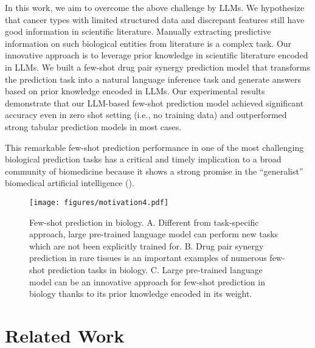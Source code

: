 In this work, we aim to overcome the above challenge by LLMs. We hypothesize that cancer types with limited structured data and discrepant features still have good information in scientific literature.  Manually extracting predictive information on such biological entities from literature is a complex task. Our innovative approach is to leverage prior knowledge in scientific literature encoded in LLMs. We built a few-shot drug pair synergy prediction model that transforms the prediction task into a natural language inference task and generate answers based on prior knowledge encoded in LLMs. Our experimental results demonstrate that our LLM-based few-shot prediction model achieved significant accuracy even in zero shot setting (i.e., no training data) and outperformed strong tabular prediction models in most cases. 

This remarkable few-shot prediction performance in one of the most challenging biological prediction tasks has a critical and timely implication to a broad community of biomedicine because it shows a strong promise in the ``generalist'' biomedical artificial intelligence (\cite{Moor2023-dp}). 

\begin{figure}[t]
  \centering 
  \texttt{[image: figures/motivation4.pdf]}
  \caption{Few-shot prediction in biology. A. Different from task-specific approach, large pre-trained language model can perform new tasks which are not been explicitly trained for. B. Drug pair synergy prediction in rare tissues is an important examples of numerous few-shot prediction tasks in biology. C. Large pre-trained language model can be an innovative approach for few-shot prediction in biology thanks to its prior knowledge encoded in its weight.}
  \label{fig:motivation} 
\end{figure} 

\section{Related Work}
\label{sec:related_works}

